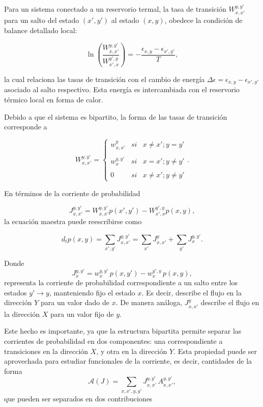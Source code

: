 Para un sistema conectado a un reservorio termal, la tasa de transición \( W_{x,x'}^{y,y'} \) para un salto del estado \( (x',y') \) al estado \( (x,y) \), obedece la condición de balance detallado local:

\[
\ln \left( \frac{W_{x,x'}^{y,y'}}{W_{x',x}^{y',y}} \right) = -\frac{\epsilon_{x,y} - \epsilon_{x',y'}}{T},
\]

la cual relaciona las tasas de transición con el cambio de energía \( \Delta \epsilon = \epsilon_{x,y} - \epsilon_{x',y'} \) asociado al salto respectivo. Esta energía es intercambiada con el reservorio térmico local en forma de calor.

Debido a que el sistema es bipartito, la forma de las tasas de transición corresponde a

\begin{equation*}
    W_{x,x'}^{y,y'} = \left\{ \begin{array}{lcc} w_{x,x'}^{y} & si & x \neq x'; y=y' \\ \\ w_{x}^{y,y'} & si & x=x';y\neq y'\\ \\ 0 & si & x \neq x'; y \neq y' \end{array} \right..
\end{equation*}

En términos de la corriente de probabilidad 

\begin{equation*}
    J_{x,x'}^{y,y'} = W_{x,x'}^{y,y'}p(x',y') - W_{x',x}^{y',y}p(x,y),
\end{equation*}
la ecuación maestra puede reescribirse como 

\begin{equation*}
    d_{t}p(x,y) = \sum_{x',y'}J_{x,x'}^{y,y'} = \sum_{x'}J_{x,x'}^{y} + \sum_{y'}J_{x}^{y,y'}.
\end{equation*}

Donde  
\[
J_{x}^{y,y'} = w_{x}^{y,y'}\,p(x,y') - w_{x}^{y',y}\,p(x,y),
\]
representa la corriente de probabilidad correspondiente a un salto entre los estados \( y' \to y \), manteniendo fijo el estado \( x \). Es decir, describe el flujo en la dirección \( Y \) para un valor dado de \( x \). De manera análoga, $J^{y}_{x,x'}$ describe el flujo en la dirección \( X\) para un valor fijo de \(y\).  

Este hecho es importante, ya que la estructura bipartita permite separar las corrientes de probabilidad en dos componentes: una correspondiente a transiciones en la dirección \( X \), y otra en la dirección \( Y \). Esta propiedad puede ser aprovechada para estudiar funcionales de la corriente, es decir, cantidades de la forma
\[
\mathcal{A}(J) = \sum_{x,x',y,y'} J_{x,x'}^{y,y'}\, A_{x,x'}^{y,y'},
\]
que pueden ser separados en dos contribuciones

